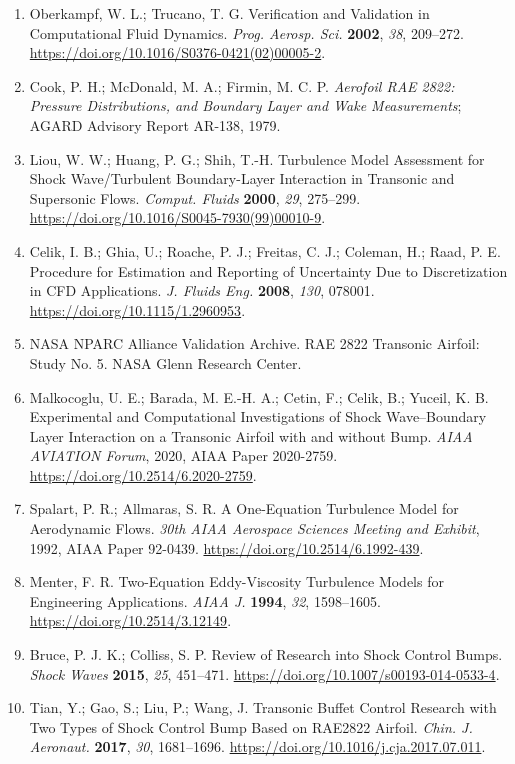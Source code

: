 \documentclass[10pt]{article}
\begin{document}
\begin{enumerate}[
    label=\arabic*.,
    leftmargin=1.7em,
    itemsep=4pt,
    topsep=0pt
]

\item
Oberkampf, W. L.; Trucano, T. G.
Verification and Validation in Computational Fluid Dynamics.
\textit{Prog. Aerosp. Sci.}
\textbf{2002}, \textit{38}, 209--272.
\url{https://doi.org/10.1016/S0376-0421(02)00005-2}.

\item
Cook, P. H.; McDonald, M. A.; Firmin, M. C. P.
\textit{Aerofoil RAE 2822: Pressure Distributions, and Boundary Layer
and Wake Measurements};
AGARD Advisory Report AR-138, 1979.

\item
Liou, W. W.; Huang, P. G.; Shih, T.-H.
Turbulence Model Assessment for Shock Wave/Turbulent Boundary-Layer
Interaction in Transonic and Supersonic Flows.
\textit{Comput. Fluids}
\textbf{2000}, \textit{29}, 275--299.
\url{https://doi.org/10.1016/S0045-7930(99)00010-9}.

\item
Celik, I. B.; Ghia, U.; Roache, P. J.; Freitas, C. J.;
Coleman, H.; Raad, P. E.
Procedure for Estimation and Reporting of Uncertainty Due to
Discretization in CFD Applications.
\textit{J. Fluids Eng.}
\textbf{2008}, \textit{130}, 078001.
\url{https://doi.org/10.1115/1.2960953}.

\item
NASA NPARC Alliance Validation Archive.
RAE 2822 Transonic Airfoil: Study No. 5.
NASA Glenn Research Center.

\item
Malkocoglu, U. E.; Barada, M. E.-H. A.; Cetin, F.;
Celik, B.; Yuceil, K. B.
Experimental and Computational Investigations of Shock Wave--Boundary
Layer Interaction on a Transonic Airfoil with and without Bump.
\textit{AIAA AVIATION Forum}, 2020, AIAA Paper 2020-2759.
\url{https://doi.org/10.2514/6.2020-2759}.

\item
Spalart, P. R.; Allmaras, S. R.
A One-Equation Turbulence Model for Aerodynamic Flows.
\textit{30th AIAA Aerospace Sciences Meeting and Exhibit},
1992, AIAA Paper 92-0439.
\url{https://doi.org/10.2514/6.1992-439}.

\item
Menter, F. R.
Two-Equation Eddy-Viscosity Turbulence Models for Engineering
Applications.
\textit{AIAA J.}
\textbf{1994}, \textit{32}, 1598--1605.
\url{https://doi.org/10.2514/3.12149}.

\item
Bruce, P. J. K.; Colliss, S. P.
Review of Research into Shock Control Bumps.
\textit{Shock Waves}
\textbf{2015}, \textit{25}, 451--471.
\url{https://doi.org/10.1007/s00193-014-0533-4}.

\item
Tian, Y.; Gao, S.; Liu, P.; Wang, J.
Transonic Buffet Control Research with Two Types of Shock Control
Bump Based on RAE2822 Airfoil.
\textit{Chin. J. Aeronaut.}
\textbf{2017}, \textit{30}, 1681--1696.
\url{https://doi.org/10.1016/j.cja.2017.07.011}.

\end{enumerate}
\end{document}
